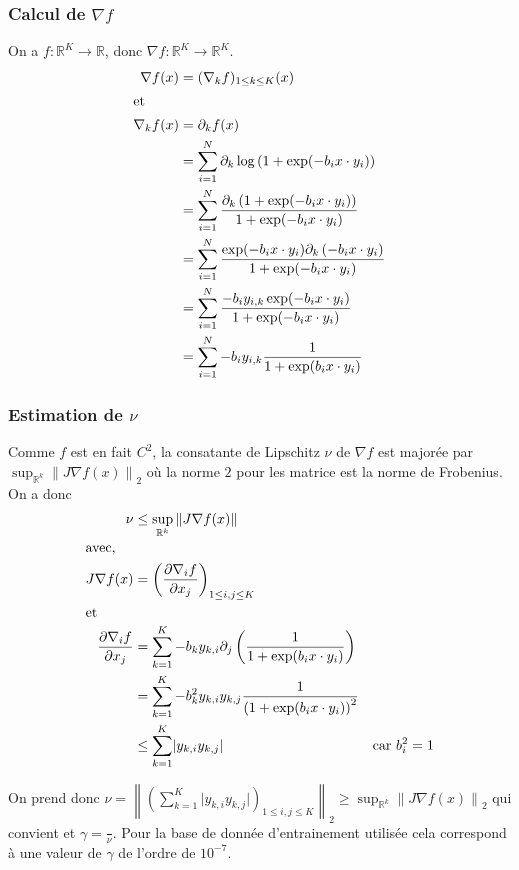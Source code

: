 \documentclass{article}
\newcommand{\Rset}{\mathbb{R}}
\newcommand{\grad}{\nabla}
\newcommand{\norm}[2][2]{\left\lVert#2\right\rVert_{#1}}
\begin{document}
\subsubsection{Calcul de $\grad f$}
On a $f : \Rset^K \to \Rset$,  donc $\grad f : \Rset^K \to \Rset^K$.
\begin{align*}
  \grad f(x) &= (\grad_k f)_{1 \leq k \leq K}(x)\\
  \intertext{et}
  \grad_k f(x) &= \partial_k f(x)\\
  &= \sum_{i = 1}^N \partial_k \log \left( 1 + \exp(-b_i x\cdot y_i) \right)\\
  &= \sum_{i = 1}^N \frac{\partial_k \left( 1 + \exp(-b_i x\cdot y_i) \right)}{1 + \exp(-b_i x\cdot y_i)}\\
  &= \sum_{i = 1}^N \frac{\exp(-b_i x\cdot y_i) \partial_k \left(-b_i x\cdot y_i \right) }{1 + \exp(-b_i x\cdot y_i)}\\
  &= \sum_{i = 1}^N \frac{-b_i  y_{i,k}\exp(-b_i x\cdot y_i)}{1 + \exp(-b_i x\cdot y_i)}\\
  &= \sum_{i = 1}^N -b_i  y_{i,k}\frac{1}{1 + \exp(b_i x\cdot y_i)}
\end{align*}

\subsubsection{Estimation de $\nu$}
Comme $f$ est en fait $C^2$, la consatante de Lipschitz $\nu$ de $\grad f$ est majorée par $\sup_{\Rset^k} \norm{J \grad f (x)}$ où la norme $2$ pour les matrice est la norme de Frobenius. On  a donc
\begin{align*}
  \nu &\leq \sup_{\Rset^k} \norm[]{J \grad f(x)}&&\\
  \intertext{avec,}
  J \grad f (x) &= \left(
    \frac{\partial \grad_i f}{\partial x_j}
  \right)_{1\leq i,j \leq K}&&\\
  \intertext{et}
  \frac{\partial \grad_i f}{\partial x_j} &= \sum_{k = 1}^K
  -b_k y_{k,i} \partial_j \left(\frac{1}{1 + \exp(b_i x \cdot y_i)} \right)&&\\
  &= \sum_{k = 1}^K -b_k^2 y_{k,i} y_{k,j}  \frac{1}{\left(1 + \exp(b_i x \cdot y_i)\right)^2}&&\\
  &\leq \sum_{k = 1}^K \lvert y_{k,i} y_{k,j} \rvert  & &\text{car } b_i^2 = 1
\end{align*}

On prend donc $\nu = \norm{\left(\sum_{k = 1}^K \lvert y_{k,i} y_{k,j} \rvert \right)_{1 \leq i, j\leq K}} \geq \sup_{\Rset^k} \norm{J \grad f (x)}$ qui convient et $\gamma = \frac{}{\nu}$. Pour la base de donnée d'entrainement utilisée cela correspond à une valeur de $\gamma$ de l'ordre de $10^{-7}$.
\end{document}
